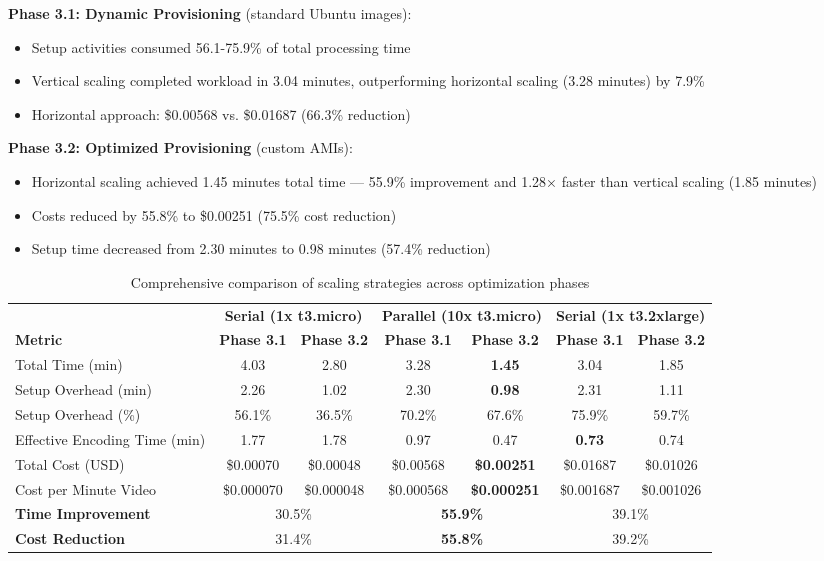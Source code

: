 \documentclass[conference]{IEEEtran}
\begin{document}
	\textbf{Phase 3.1: Dynamic Provisioning} (standard Ubuntu images):
	\begin{itemize}
		\item Setup activities consumed 56.1-75.9\% of total processing time
		\item Vertical scaling completed workload in 3.04 minutes, outperforming horizontal scaling (3.28 minutes) by 7.9\%
		\item Horizontal approach: \$0.00568 vs. \$0.01687 (66.3\% reduction)
	\end{itemize}
	
	\textbf{Phase 3.2: Optimized Provisioning} (custom AMIs):
	\begin{itemize}
		\item Horizontal scaling achieved 1.45 minutes total time — 55.9\% improvement and 1.28× faster than vertical scaling (1.85 minutes)
		\item Costs reduced by 55.8\% to \$0.00251 (75.5\% cost reduction)
		\item Setup time decreased from 2.30 minutes to 0.98 minutes (57.4\% reduction)
	\end{itemize}
	
	\begin{table}[t]
		\centering
		\caption{Comprehensive comparison of scaling strategies across optimization phases}
		\label{tab:unified_case_study}
		\begin{tabular*}{\textwidth}{l @{\extracolsep{\fill}} | cc | cc | cc}
			\toprule
			& \multicolumn{2}{c|}{\textbf{Serial (1x t3.micro)}} & \multicolumn{2}{c|}{\textbf{Parallel (10x t3.micro)}} & \multicolumn{2}{c}{\textbf{Serial (1x t3.2xlarge)}} \\
			\cmidrule(lr){2-3} \cmidrule(lr){4-5} \cmidrule(lr){6-7}
			\textbf{Metric} & \textbf{Phase 3.1} & \textbf{Phase 3.2} & \textbf{Phase 3.1} & \textbf{Phase 3.2} & \textbf{Phase 3.1} & \textbf{Phase 3.2} \\
			\midrule
			Total Time (min)          & 4.03  & 2.80  & 3.28 & \textbf{1.45} & 3.04 & 1.85 \\
			Setup Overhead (min)      & 2.26  & 1.02  & 2.30 & \textbf{0.98} & 2.31 & 1.11 \\
			Setup Overhead (\%)       & 56.1\% & 36.5\% & 70.2\% & 67.6\% & 75.9\% & 59.7\% \\
			Effective Encoding Time (min) & 1.77  & 1.78  & 0.97 & 0.47 & \textbf{0.73} & 0.74 \\
			\midrule
			Total Cost (USD)          & \$0.00070 & \$0.00048 & \$0.00568 & \textbf{\$0.00251} & \$0.01687 & \$0.01026 \\
			Cost per Minute Video     & \$0.000070 & \$0.000048 & \$0.000568 & \textbf{\$0.000251} & \$0.001687 & \$0.001026 \\
			\midrule \midrule
			\textbf{Time Improvement} & \multicolumn{2}{c|}{30.5\%} & \multicolumn{2}{c|}{\textbf{55.9\%}} & \multicolumn{2}{c}{39.1\%} \\
			\textbf{Cost Reduction}   & \multicolumn{2}{c|}{31.4\%} & \multicolumn{2}{c|}{\textbf{55.8\%}} & \multicolumn{2}{c}{39.2\%} \\
			\bottomrule
		\end{tabular*}
	\end{table}
	
\end{document}
